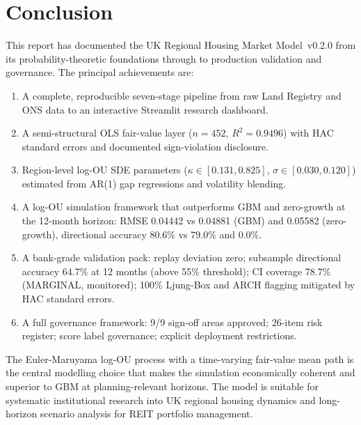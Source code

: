 \documentclass[11pt,a4paper]{article}
\theoremstyle{plain}
\theoremstyle{definition}
\newcommand{\kap}{\kappa}
\newcommand{\sig}{\sigma}
\begin{document}
\section{Conclusion}

This report has documented the UK Regional Housing Market Model~v0.2.0
from its probability-theoretic foundations through to production
validation and governance.  The principal achievements are:

\begin{enumerate}[leftmargin=1.8em]
  \item A complete, reproducible seven-stage pipeline from raw Land Registry
        and ONS data to an interactive Streamlit research dashboard.
  \item A semi-structural OLS fair-value layer ($n=452$, $R^2=0.9496$)
        with HAC standard errors and documented sign-violation disclosure.
  \item Region-level log-OU SDE parameters ($\kap \in [0.131, 0.825]$,
        $\sig \in [0.030, 0.120]$) estimated from AR(1) gap regressions
        and volatility blending.
  \item A log-OU simulation framework that outperforms GBM and zero-growth
        at the 12-month horizon: RMSE 0.04442 vs 0.04881 (GBM) and 0.05582
        (zero-growth), directional accuracy 80.6\% vs 79.0\% and 0.0\%.
  \item A bank-grade validation pack: replay deviation zero; subsample
        directional accuracy 64.7\% at 12 months (above 55\% threshold);
        CI coverage 78.7\% (MARGINAL, monitored); 100\% Ljung-Box and ARCH
        flagging mitigated by HAC standard errors.
  \item A full governance framework: 9/9 sign-off areas approved; 26-item
        risk register; score label governance; explicit deployment restrictions.
\end{enumerate}

The Euler-Maruyama log-OU process with a time-varying fair-value mean
path is the central modelling choice that makes the simulation
economically coherent and superior to GBM at planning-relevant horizons.
The model is suitable for systematic institutional research into UK
regional housing dynamics and long-horizon scenario analysis for REIT
portfolio management.
\end{document}

